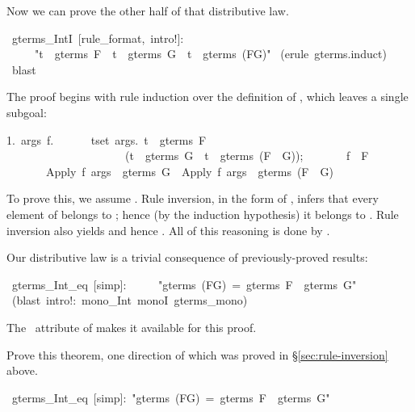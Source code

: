 Now we can prove the other half of that distributive law.
\begin{isabelle}
\ gterms_IntI\ [rule_format,\ intro!]:\isanewline
\ \ \ \ \ "t\ \isasymin \ gterms\ F\ \isasymLongrightarrow \ t\ \isasymin \ gterms\ G\ \isasymlongrightarrow \ t\ \isasymin \ gterms\ (F\isasyminter G)"\isanewline
{}\ (erule\ gterms.induct)\isanewline
{}\ blast\isanewline
{}
\end{isabelle}
%
The proof begins with rule induction over the definition of
, which leaves a single subgoal:  
\begin{isabelle}
1.\ \isasymAnd args\ f.\isanewline
\ \ \ \ \ \ \isasymlbrakk \isasymforall t\isasymin set\ args.\ t\ \isasymin \ gterms\ F\ \isasymand\isanewline
\ \ \ \ \ \ \ \ \ \ \ \ \ \ \ \ \ \ \ \ \ (t\ \isasymin \ gterms\ G\ \isasymlongrightarrow \ t\ \isasymin \ gterms\ (F\ \isasyminter \ G));\isanewline
\ \ \ \ \ \ \ f\ \isasymin \ F\isasymrbrakk \isanewline
\ \ \ \ \ \ \isasymLongrightarrow \ Apply\ f\ args\ \isasymin \ gterms\ G\ \isasymlongrightarrow \ Apply\ f\ args\ \isasymin \ gterms\ (F\ \isasyminter \ G)
\end{isabelle}
%
To prove this, we assume .  Rule inversion, in the form of , infers
that every element of \isa{args} belongs to 
; hence (by the induction hypothesis) it belongs
to .  Rule inversion also yields
\isa{f\ \isasymin\ G} and hence . 
All of this reasoning is done by \isa{blast}.

\smallskip
Our distributive law is a trivial consequence of previously-proved results:
\begin{isabelle}
\ gterms_Int_eq\ [simp]:\isanewline
\ \ \ \ \ "gterms\ (F\isasyminter G)\ =\ gterms\ F\ \isasyminter \ gterms\ G"\isanewline
\isacommand{by}\ (blast\ intro!:\ mono_Int\ monoI\ gterms_mono)
\end{isabelle}
The \ attribute of  makes it available for
this proof.


\begin{exercise}
Prove this theorem, one direction of which was proved in
{\S}\ref{sec:rule-inversion} above.
\begin{isabelle}
\ gterms_Int_eq\ [simp]:\ "gterms\ (F\isasyminter G)\ =\
gterms\ F\ \isasyminter \ gterms\ G"\isanewline
\end{isabelle}
\end{exercise}


